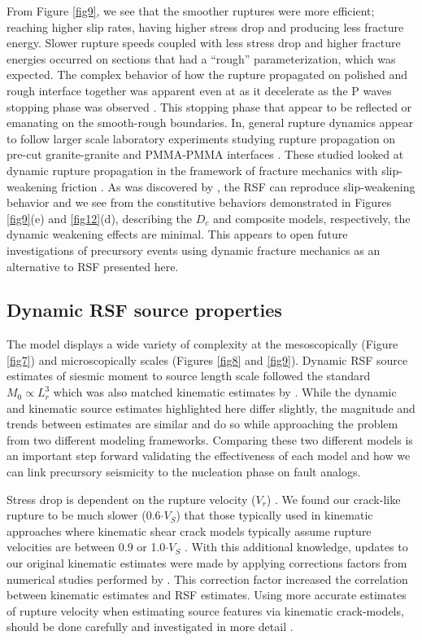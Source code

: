 \documentclass[preprint,1p, 10pt,authoryear]{elsarticle}
\begin{document}
From Figure \ref{fig9}, we see that the smoother ruptures were more efficient; reaching higher slip rates, having higher stress drop and producing less fracture energy. Slower rupture speeds coupled with less stress drop and higher fracture energies occurred on sections that had a ``rough'' parameterization, which was expected.  The complex behavior of how the rupture propagated on polished and rough interface together was apparent even at as it decelerate as the P waves stopping phase was observed \citep{Madariaga1976}. This stopping phase that appear to be reflected or emanating on the smooth-rough boundaries. In, general rupture dynamics appear to follow larger scale laboratory experiments studying rupture propagation on pre-cut granite-granite \citep{Passelegue2013} and PMMA-PMMA interfaces \citep{Rubinstein2004,Rubinstein2006,Ben-David2010, Fineberg2015}. These studied looked at dynamic rupture propagation in the framework of fracture mechanics with slip-weakening friction \citep{Ida1972,Andrews1976,Kammer2012,Kammer2015}.  As was discovered by \citet{Cocco2002}, the RSF can reproduce slip-weakening behavior and we see from the constitutive behaviors demonstrated in Figures \ref{fig9}(e) and \ref{fig12}(d), describing the $D_{c}$  and composite models, respectively, the dynamic weakening effects are minimal.  This appears to open future investigations of precursory events using dynamic fracture mechanics as an alternative to RSF presented here.

\subsection{Dynamic RSF source properties}
The model displays a wide variety of complexity at the mesoscopically (Figure \ref{fig7}) and microscopically scales (Figures \ref{fig8} and \ref{fig9}). Dynamic RSF source estimates of siesmic moment to source length scale followed the standard $M_{0} \propto L^{3}_{r}$  which was also matched kinematic estimates by \citet{Selvadurai2019}. While the dynamic and kinematic source estimates highlighted here differ slightly, the magnitude and trends between estimates are similar and do so while approaching the problem from two different modeling frameworks. Comparing these two different models is an important step forward validating the effectiveness of each model and how we can link precursory seismicity to the nucleation phase on fault analogs.

Stress drop is dependent on the rupture velocity ($V_{r}$) \citep{Kaneko2015}. We found our crack-like rupture to be much slower (0.6$\cdot V_{S}$) that those typically used in kinematic approaches where kinematic shear crack models typically assume rupture velocities are between 0.9 or 1.0$\cdot V_{S}$ \citep{Cocco2016, Selvadurai2019}. With this additional knowledge, updates to our original kinematic estimates were made by applying corrections factors from numerical studies performed by \citet{Kaneko2015}. This correction factor increased the correlation between kinematic estimates and RSF estimates. Using more accurate estimates of rupture velocity when estimating source features via kinematic crack-models, should be done carefully and investigated in more detail \citep{McGuire2018}.
\end{document}
